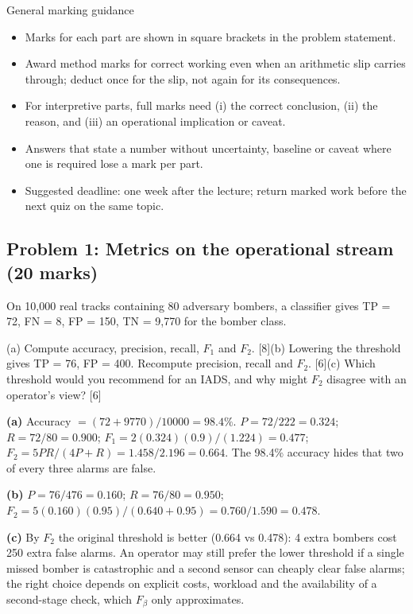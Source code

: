 \documentclass[11pt]{article}
\begin{document}
\begin{instr}{General marking guidance}\begin{itemize}
\item Marks for each part are shown in square brackets in the problem statement.
\item Award method marks for correct working even when an arithmetic slip carries through; deduct once for the slip, not again for its consequences.
\item For interpretive parts, full marks need (i) the correct conclusion, (ii) the reason, and (iii) an operational implication or caveat.
\item Answers that state a number without uncertainty, baseline or caveat where one is required lose a mark per part.
\item Suggested deadline: one week after the lecture; return marked work before the next quiz on the same topic.
\end{itemize}\end{instr}

\subsection{Problem 1: Metrics on the operational stream \normalfont\small\color{GreyN}(20 marks)}

\begin{prob}On 10,000 real tracks containing 80 adversary bombers, a classifier gives TP = 72, FN = 8, FP = 150, TN = 9,770 for the bomber class.

(a) Compute accuracy, precision, recall, $F_1$ and $F_2$. [8]\newline (b) Lowering the threshold gives TP = 76, FP = 400. Recompute precision, recall and $F_2$. [6]\newline (c) Which threshold would you recommend for an IADS, and why might $F_2$ disagree with an operator's view? [6]\end{prob}

\begin{soln}\textbf{(a)} Accuracy $=(72+9770)/10000=98.4\%$. $P=72/222=0.324$; $R=72/80=0.900$; $F_1=2(0.324)(0.9)/(1.224)=0.477$; $F_2=5PR/(4P+R)=1.458/2.196=\mathbf{0.664}$. The 98.4\% accuracy hides that two of every three alarms are false.

\textbf{(b)} $P=76/476=0.160$; $R=76/80=0.950$; $F_2=5(0.160)(0.95)/(0.640+0.95)=0.760/1.590=\mathbf{0.478}$.

\textbf{(c)} By $F_2$ the original threshold is better (0.664 vs 0.478): 4 extra bombers cost 250 extra false alarms. An operator may still prefer the lower threshold if a single missed bomber is catastrophic and a second sensor can cheaply clear false alarms; the right choice depends on explicit costs, workload and the availability of a second-stage check, which $F_\beta$ only approximates.\end{soln}
\end{document}
